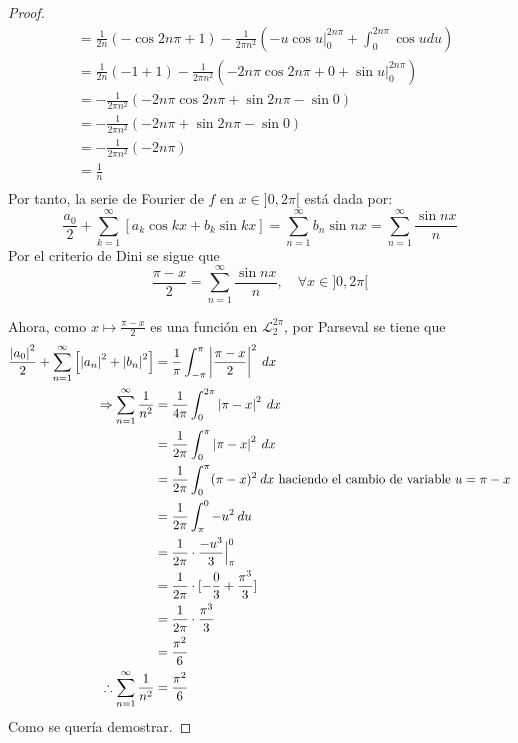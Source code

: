 \documentclass[12pt]{report}
\newcounter{it}
\theoremstyle{largebreak}
\newcommand\abs[1]{\ensuremath{\left|#1\right|}}
\begin{document}
\begin{proof}
\begin{equation*}
\begin{split}
                &=\frac{1}{2n}(-\cos 2n\pi+1)-\frac{1}{2\pi n^2}\left(-u\cos u\Big|_{0}^{2n\pi}+\int_{0}^{2n\pi}\cos udu \right) \\
                &=\frac{1}{2n}(-1+1)-\frac{1}{2\pi n^2}\left(-2n\pi\cos 2n\pi+0+\sin u\Big|_{0}^{2n\pi} \right) \\
                &=-\frac{1}{2\pi n^2}\left(-2n\pi\cos 2n\pi+\sin 2n\pi-\sin 0 \right) \\
                &=-\frac{1}{2\pi n^2}\left(-2n\pi+\sin 2n\pi-\sin 0 \right) \\
                &=-\frac{1}{2\pi n^2}\left(-2n\pi \right) \\
                &=\frac{1}{n}\\
            \end{split}
        \end{equation*}
        Por tanto, la serie de Fourier de $f$ en $x\in]0,2\pi[$ está dada por:
        \begin{equation*}
            \frac{a_0}{2}+\sum_{ k=1}^\infty\left[a_k\cos kx+b_k\sin kx \right]=\sum_{ n=1}^\infty b_n\sin nx=\sum_{ n=1}^\infty\frac{\sin nx}{n}
        \end{equation*}
        Por el criterio de Dini se sigue que
        \begin{equation*}
            \frac{\pi-x}{2}=\sum_{ n=1}^\infty\frac{\sin nx}{n},\quad\forall x\in]0,2\pi[
        \end{equation*}

        Ahora, como $x\mapsto\frac{\pi-x}{2}$ es una función en $\mathcal{L}_2^{2\pi}$, por Parseval se tiene que
        \begin{equation*}
            \begin{split}
                \frac{\abs{a_0}^2}{2}+\sum_{n=1}^\infty\left[\abs{a_n}^2+\abs{b_n}^2 \right]&=\frac{1}{\pi}\int_{-\pi}^{\pi}\abs{\frac{\pi-x}{2}}^2\:dx\\
                \Rightarrow \sum_{ n=1}^\infty\frac{1}{n^2}&=\frac{1}{4\pi}\int_0^{2\pi}\abs{\pi-x}^2\:dx\\
                &=\frac{1}{2\pi}\int_0^{\pi}\abs{\pi-x}^2\:dx\\
                &=\frac{1}{2\pi}\int_0^{\pi}(\pi-x)^2\:dx\textup{ haciendo el cambio de variable }u=\pi-x \\
                &=\frac{1}{2\pi}\int_{\pi}^{0}-u^2\:du\\
                &=\frac{1}{2\pi}\cdot\frac{-u^3}{3}\Big|_{\pi}^{0}\\
                &=\frac{1}{2\pi}\cdot[-\frac{0}{3}+\frac{\pi^3}{3} ]\\
                &=\frac{1}{2\pi}\cdot\frac{\pi^3}{3}\\
                &=\frac{\pi^2}{6}\\
                \therefore \sum_{ n=1}^\infty\frac{1}{n^2}&=\frac{\pi^2}{6}\\
            \end{split}
        \end{equation*}
        Como se quería demostrar.
    \end{proof}
\end{document}
